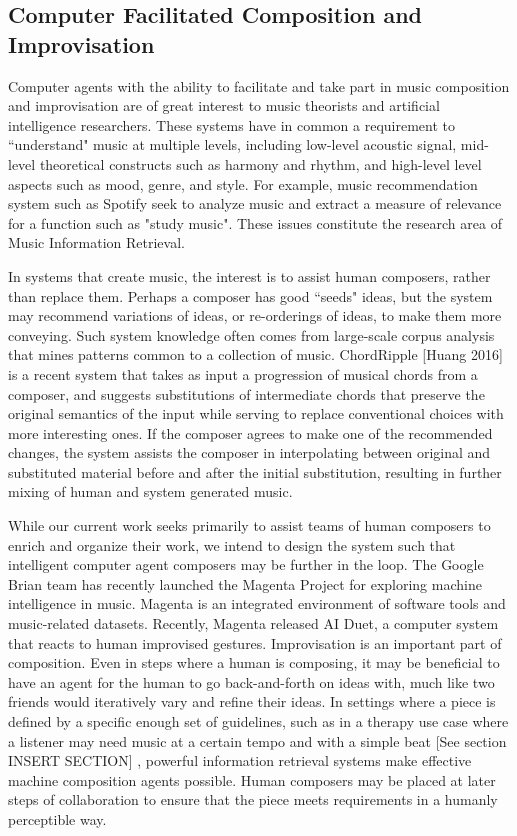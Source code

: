 \documentclass[final,authoryear,5p,times,twocolumn]{elsarticle}
\begin{document}
\subsection{Computer Facilitated Composition and Improvisation}

Computer agents with the ability to facilitate and take part in music composition and improvisation are of great interest to music theorists and artificial intelligence researchers. These systems have in common a requirement to ``understand" music at multiple levels, including low-level acoustic signal, mid-level theoretical constructs such as harmony and rhythm, and high-level level aspects such as mood, genre, and style. For example, music recommendation system such as Spotify seek to analyze music and extract a measure of relevance for a function such as "study music". These issues constitute the research area of Music Information Retrieval.

In systems that create music, the interest is to assist human composers, rather than replace them. Perhaps a composer has good ``seeds" ideas, but the system may recommend variations of ideas, or re-orderings of ideas, to make them more conveying. Such system knowledge often comes from large-scale corpus analysis that mines patterns common to a collection of music. ChordRipple [Huang 2016] is a recent system that takes as input a progression of musical chords from a composer, and suggests substitutions of intermediate chords that preserve the original semantics of the input while serving to replace conventional choices with more interesting ones. If the composer agrees to make one of the recommended changes, the system assists the composer in interpolating between original and substituted material before and after the initial substitution, resulting in further mixing of human and system generated music.

While our current work seeks primarily to assist teams of human composers to enrich and organize their work, we intend to design the system such that intelligent computer agent composers may be further in the loop. The Google Brian team has recently launched the Magenta Project for exploring machine intelligence in music. Magenta is an integrated environment of software tools and music-related datasets. Recently, Magenta released AI Duet, a computer system that reacts to human improvised gestures. Improvisation is an important part of composition. Even in steps where a human is composing, it may be beneficial to have an agent for the human to go back-and-forth on ideas with, much like two friends would iteratively vary and refine their ideas. In settings where a piece is defined by a specific enough set of guidelines, such as in a therapy use case where a listener may need music at a certain tempo and with a simple beat [See section INSERT SECTION] , powerful information retrieval systems make effective machine composition agents possible. Human composers may be placed at later steps of collaboration to ensure that the piece meets requirements in a humanly perceptible way.
\end{document}

